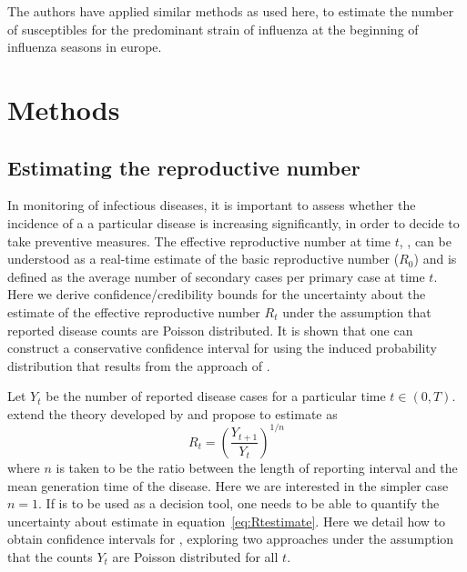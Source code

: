 The authors have applied similar methods as used here, to estimate the number 
of susceptibles for the predominant strain of influenza at the beginning of  
influenza seasons in europe\cite{pone2011}.


\section*{Methods}

\subsection*{Estimating the reproductive number}

In monitoring of infectious diseases, it is important to assess whether the 
incidence of a a particular disease is increasing significantly, in order to 
decide to take preventive measures.
The effective reproductive number at time $t$, \rr, can be understood as a 
real-time estimate of the basic reproductive number ($R_{0}$) and is defined as 
the average number of secondary cases per primary case at time $t$.
Here we derive confidence/credibility bounds for the uncertainty about the 
estimate of the effective reproductive number $R_t$ under the assumption that 
reported disease counts are Poisson distributed.
It is shown that one can construct a conservative confidence interval for \rr 
using the induced probability distribution that results from the approach of 
\cite{mantel}.

Let $Y_t$ be the number of reported disease cases for a particular time $t \in 
(0, T)$.
\cite{nishiura} extend the theory developed by \cite{stallybrass} and propose 
to estimate \rr as
\begin{equation}
\label{eq:Rtestimate}
R_t = \left( \frac{Y_{t+1}}{Y_t}\right)^{1/n}
\end{equation}
where $n$ is taken to be the ratio between the length of reporting interval and 
the mean generation time of the disease.
Here we are interested in the simpler case $n=1$.
If \rr is to be used as a decision tool, one needs to be able to quantify the 
uncertainty about estimate in equation~\ref{eq:Rtestimate}. 
Here we detail how to obtain confidence intervals for \rr, exploring two 
approaches under the assumption that the counts $Y_t$ are Poisson distributed 
for all $t$.

